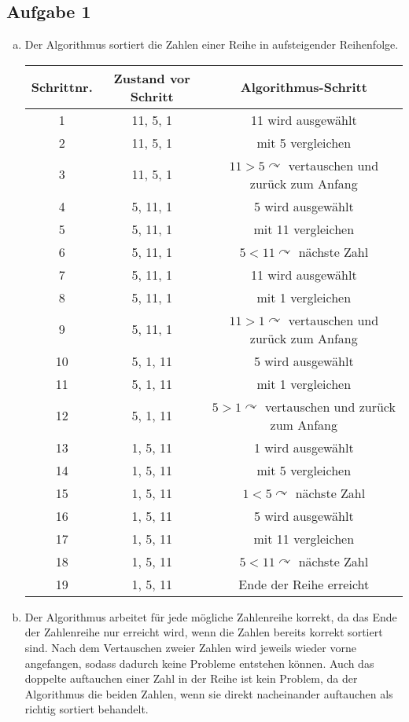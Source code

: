 \documentclass[11pt]{article}
\begin{document}
\subsection*{Aufgabe 1}
\begin{enumerate}[a)]

\item Der Algorithmus sortiert die Zahlen einer Reihe in aufsteigender Reihenfolge.

\begin{table}[H]
\centering
\begin{tabular}{|c|c|c|}
\hline 
Schrittnr. & Zustand vor Schritt & Algorithmus-Schritt \\ 
\hline 
1 & 11, 5, 1 & 11 wird ausgew\"ahlt \\ 
\hline 
2 & 11, 5, 1 & mit 5 vergleichen \\ 
\hline 
3 & 11, 5, 1 & $11>5\curvearrowright$ vertauschen und zur\"uck zum Anfang \\ 
\hline 
4 & 5, 11, 1 & 5 wird ausgew\"ahlt \\ 
\hline 
5 & 5, 11, 1 & mit 11 vergleichen \\ 
\hline 
6 & 5, 11, 1 & $5<11\curvearrowright$ n\"achste Zahl \\ 
\hline 
7 & 5, 11, 1 & 11 wird ausgew\"ahlt \\ 
\hline 
8 & 5, 11, 1 & mit 1 vergleichen \\ 
\hline 
9 & 5, 11, 1 & $11>1\curvearrowright$ vertauschen und zur\"uck zum Anfang \\ 
\hline 
10 & 5, 1, 11 & 5 wird ausgew\"ahlt \\ 
\hline 
11 & 5, 1, 11 & mit 1 vergleichen \\ 
\hline 
12 & 5, 1, 11 & $5>1\curvearrowright$ vertauschen und zur\"uck zum Anfang \\ 
\hline 
13 & 1, 5, 11 & 1 wird ausgew\"ahlt \\ 
\hline 
14 & 1, 5, 11 & mit 5 vergleichen \\ 
\hline 
15 & 1, 5, 11 & $1<5\curvearrowright$ n\"achste Zahl \\ 
\hline 
16 & 1, 5, 11 & 5 wird ausgew\"ahlt \\ 
\hline 
17 & 1, 5, 11 & mit 11 vergleichen \\ 
\hline 
18 & 1, 5, 11 & $5<11\curvearrowright$ n\"achste Zahl \\ 
\hline 
19 & 1, 5, 11 & Ende der Reihe erreicht \\ 
\hline 
\end{tabular} 
\end{table}

\item Der Algorithmus arbeitet f\"ur jede m\"ogliche Zahlenreihe korrekt, da das Ende der Zahlenreihe nur erreicht wird, wenn die Zahlen bereits korrekt sortiert sind. Nach dem Vertauschen zweier Zahlen wird jeweils wieder vorne angefangen, sodass dadurch keine Probleme entstehen k\"onnen. Auch das doppelte auftauchen einer Zahl in der Reihe ist kein Problem, da der Algorithmus die beiden Zahlen, wenn sie direkt nacheinander auftauchen als richtig sortiert behandelt.
\end{enumerate}
\end{document}
